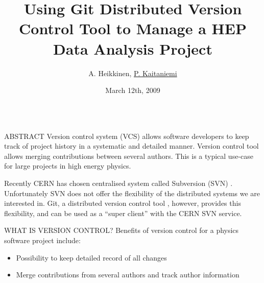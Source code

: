 \documentclass[final,hyperref={pdfpagelabels=false},notitlepage=true]{beamer}
\title[]{\Huge Using Git Distributed Version Control Tool to Manage a HEP Data Analysis Project}
\author{A. Heikkinen\inst{1}, \underline{P. Kaitaniemi\inst{1,2}}}
\institute[] %
{
  \inst{1}%
  Helsinki Institute of Physics P.O.Box 64 (Gustaf H\"allstr\"omin katu 2), FIN-00014 University of Helsinki, Finland
  \\
  \inst{2}%
  CEN-Saclay, CEA-IRFU/SPhN, 91 191 Gif sur Yvette, France
}
\date[March 12th, 2009]{March 12th, 2009}
\begin{document}
  \begin{frame}{} 
    \vfill
    \begin{columns}[t]
      \begin{column}{0.45\linewidth}

    \begin{block}{\large ABSTRACT}
      \vskip1cm
Version control system (VCS) allows software developers to keep track of project history in
a {\color{orange} systematic} and {\color{orange} detailed} manner. 
Version control tool allows
merging contributions between several authors.
This is a typical use-case for large projects in high energy physics.


\vspace{1cm}

Recently {\color{orange} CERN has chosen centralised system called Subversion (SVN)} \cite{svnsite} \cite{cernsvn}.
Unfortunately SVN does not offer the flexibility of the
distributed systems we are interested in. 
Git, a distributed version control tool \cite{torvalds}, however, 
provides this flexibility, 
and can be used as a ``super client'' with the CERN SVN service.




\end{block}

    \vskip2cm
    \begin{block}{\large WHAT IS VERSION CONTROL?}
      \vskip1cm
      Benefits of version control for a physics software project include:
      \begin{itemize}
        \item Possibility to keep detailed record of all changes
        \item Merge contributions from several authors and track author information
      \end{itemize}


\end{block}
\end{column}
\end{columns}
\end{frame}
\end{document}
